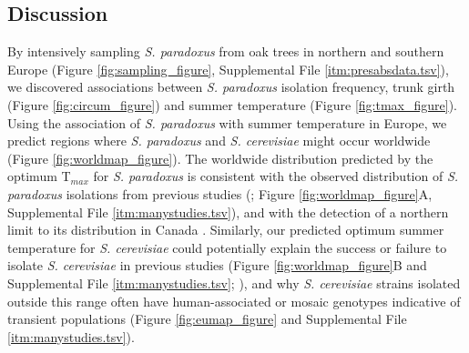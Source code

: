 \documentclass[12pt]{article}
\begin{document}
\begin{linenumbers}
\clearpage

\section*{Discussion}

By intensively sampling \textit{S. paradoxus} from oak trees in northern and southern Europe (Figure \ref{fig:sampling_figure}, Supplemental File \ref{itm:presabsdata.tsv}), we discovered associations between \textit{S. paradoxus} isolation frequency, trunk girth (Figure \ref{fig:circum_figure}) and summer temperature (Figure \ref{fig:tmax_figure}). Using the association of \textit{S. paradoxus} with summer temperature in Europe, we predict regions where \textit{S. paradoxus} and \textit{S. cerevisiae} might occur worldwide (Figure \ref{fig:worldmap_figure}). The worldwide distribution predicted by the optimum T$_{max}$ for \textit{S. paradoxus} is consistent with the observed distribution of \textit{S. paradoxus} isolations from previous studies (\citealp{boynton_ecology_2014}; Figure \ref{fig:worldmap_figure}A, Supplemental File \ref{itm:manystudies.tsv}), and with the detection of a northern limit to its distribution in Canada \citep{charron_exploring_2014,leducq_speciation_2015}. Similarly, our predicted optimum summer temperature for \textit{S. cerevisiae} could potentially explain the success or failure to isolate \textit{S. cerevisiae} in previous studies (Figure \ref{fig:worldmap_figure}B and Supplemental File \ref{itm:manystudies.tsv}; \citealp{johnson_population_2004,charron_exploring_2014,kowallik_interaction_2015}), and why \textit{S. cerevisiae} strains isolated outside this range often have human-associated or mosaic genotypes indicative of transient populations (Figure \ref{fig:eumap_figure} and Supplemental File \ref{itm:manystudies.tsv}). 


\end{linenumbers}
\end{document}
